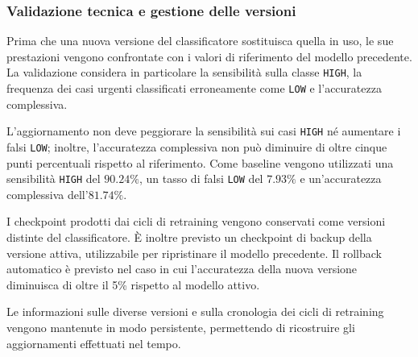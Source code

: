\subsubsection{Validazione tecnica e gestione delle versioni}
\label{sec:validazione-tecnica}
Prima che una nuova versione del classificatore sostituisca quella in uso, le sue prestazioni vengono confrontate con i valori di riferimento del modello precedente. La validazione considera in particolare la sensibilità sulla classe \texttt{HIGH}, la frequenza dei casi urgenti classificati erroneamente come \texttt{LOW} e l'accuratezza complessiva.

L'aggiornamento non deve peggiorare la sensibilità sui casi \texttt{HIGH} né aumentare i falsi \texttt{LOW}; inoltre, l'accuratezza complessiva non può diminuire di oltre cinque punti percentuali rispetto al riferimento. Come baseline vengono utilizzati una sensibilità \texttt{HIGH} del $90.24\%$, un tasso di falsi \texttt{LOW} del $7.93\%$ e un'accuratezza complessiva dell'$81.74\%$.

I checkpoint prodotti dai cicli di retraining vengono conservati come versioni distinte del classificatore. È inoltre previsto un checkpoint di backup della versione attiva, utilizzabile per ripristinare il modello precedente. Il rollback automatico è previsto nel caso in cui l'accuratezza della nuova versione diminuisca di oltre il 5\% rispetto al modello attivo.

Le informazioni sulle diverse versioni e sulla cronologia dei cicli di retraining vengono mantenute in modo persistente, permettendo di ricostruire gli aggiornamenti effettuati nel tempo.



